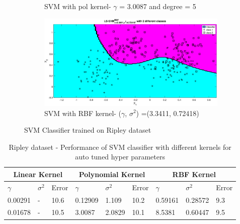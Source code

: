 \documentclass[12pt]{report}
\begin{document}
{\begin{figure}[!ht]
\begin{subfigure}{.35\textwidth}
		\caption{SVM with pol kernel- $\gamma$ = 3.0087 and degree = 5}
		\label{fig:ripley_poly_svm}
	\end{subfigure}%
	\begin{subfigure}{.35\textwidth}
		\centering
		\captionsetup{width=0.8\linewidth}
		\includegraphics[height=.65\linewidth, width=0.9\linewidth]{ripley/ripley_RBF_svm.eps}
		\caption{SVM with RBF kernel- ($\gamma$, $\sigma^2$) =(3.3411, 0.72418) } 
		\label{fig:ripley_RBF_svm}
	\end{subfigure}
	\caption{SVM Classifier trained on Ripley dataset}
	\label{fig:ripley_svm}
\end{figure}
\begin{table}[!htpb]
	\begin{tabular}{ |p{1.2cm}|p{1.2cm}|p{1.2cm}||p{1.2cm}|p{1.2cm}|p{1.2cm}||p{1.2cm}|p{1.2cm}|p{1.2cm}|}
		\hline
		\multicolumn{3}{|c||}{Linear Kernel} &\multicolumn{3}{|c||}{Polynomial Kernel}  &\multicolumn{3}{|c|}{RBF Kernel} \\ \hline	
		\cellcolor{blue!25}$\gamma$ &\cellcolor{blue!25}$\sigma^2$ & \cellcolor{blue!25}Error & \cellcolor{blue!25}$\gamma$ &\cellcolor{blue!25}$\sigma^2$ &\cellcolor{blue!25}Error & \cellcolor{blue!25}$\gamma$ &\cellcolor{blue!25}$\sigma^2$ &\cellcolor{blue!25}Error \\ \hline
		0.00291 &-&10.6 &0.12909 &1.109 &10.2 &0.59161 &0.28572 &9.3 \\ \hline
		0.01678 &- &10.5 &3.0087 &2.0829 &10.1 &8.5381 &0.60447 &9.5 \\ \hline
	\end{tabular}
	\caption{Ripley dataset - Performance of SVM classifier with different kernels for auto tuned hyper parameters}
	\label{table:6}
\end{table}

}
\end{document}
